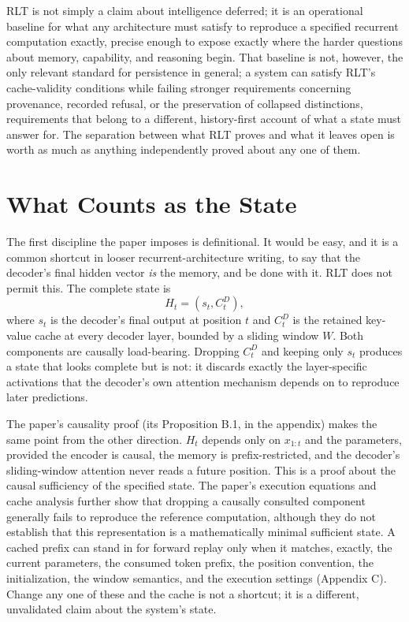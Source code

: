 \documentclass[11pt]{article}
\begin{document}
RLT is not simply a claim about intelligence deferred; it is an operational baseline for what any architecture must satisfy to reproduce a specified recurrent computation exactly, precise enough to expose exactly where the harder questions about memory, capability, and reasoning begin. That baseline is not, however, the only relevant standard for persistence in general; a system can satisfy RLT's cache-validity conditions while failing stronger requirements concerning provenance, recorded refusal, or the preservation of collapsed distinctions, requirements that belong to a different, history-first account of what a state must answer for. The separation between what RLT proves and what it leaves open is worth as much as anything independently proved about any one of them.

\section{What Counts as the State}

The first discipline the paper imposes is definitional. It would be easy, and it is a common shortcut in looser recurrent-architecture writing, to say that the decoder's final hidden vector \emph{is} the memory, and be done with it. RLT does not permit this. The complete state is
\[
H_t = (s_t, C_t^D),
\]
where $s_t$ is the decoder's final output at position $t$ and $C_t^D$ is the retained key-value cache at every decoder layer, bounded by a sliding window $W$. Both components are causally load-bearing. Dropping $C_t^D$ and keeping only $s_t$ produces a state that looks complete but is not: it discards exactly the layer-specific activations that the decoder's own attention mechanism depends on to reproduce later predictions.

The paper's causality proof (its Proposition B.1, in the appendix) makes the same point from the other direction. $H_t$ depends only on $x_{1:t}$ and the parameters, provided the encoder is causal, the memory is prefix-restricted, and the decoder's sliding-window attention never reads a future position. This is a proof about the causal sufficiency of the specified state. The paper's execution equations and cache analysis further show that dropping a causally consulted component generally fails to reproduce the reference computation, although they do not establish that this representation is a mathematically minimal sufficient state. A cached prefix can stand in for forward replay only when it matches, exactly, the current parameters, the consumed token prefix, the position convention, the initialization, the window semantics, and the execution settings (Appendix C). Change any one of these and the cache is not a shortcut; it is a different, unvalidated claim about the system's state.
\end{document}
